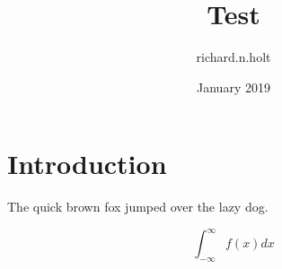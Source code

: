 \documentclass{article}
\title{Test}
\author{richard.n.holt }
\date{January 2019}
\begin{document}
\maketitle

\section{Introduction}
The quick brown fox jumped over the lazy dog.

\[
\int_{-\infty}^{\infty}
f\left(x\right)dx
\]
\end{document}
